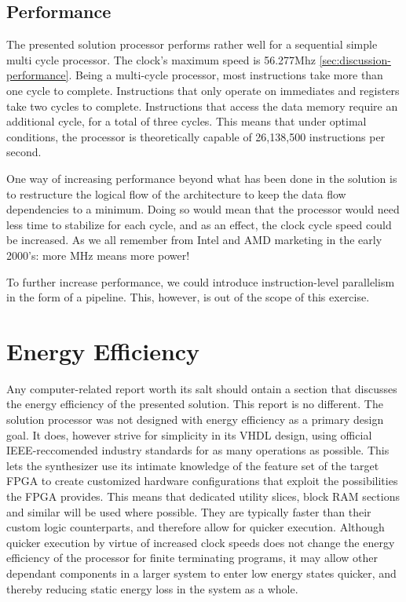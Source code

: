 \subsection{Performance}

The presented solution processor performs rather well for a sequential simple multi cycle processor.
The clock's maximum speed is 56.277Mhz \vref{sec:discussion-performance}.
Being a multi-cycle processor, most instructions take more than one cycle to complete.
Instructions that only operate on immediates and registers take two cycles to complete.
Instructions that access the data memory require an additional cycle, for a total of three cycles.
This means that under optimal conditions, the processor is theoretically capable of 26,138,500 instructions per second.

One way of increasing performance beyond what has been done in the solution is to restructure the logical flow of the architecture to keep the data flow dependencies to a minimum.
Doing so would mean that the processor would need less time to stabilize for each cycle, and as an effect, the clock cycle speed could be increased.
As we all remember from Intel and AMD marketing in the early 2000's: more MHz means more power!

To further increase performance, we could introduce instruction-level parallelism in the form of a pipeline.
This, however, is out of the scope of this exercise.

\section{Energy Efficiency}

Any computer-related report worth its salt should ontain a section that discusses the energy efficiency of the presented solution.
This report is no different.
The solution processor was not designed with energy efficiency as a primary design goal.
It does, however strive for simplicity in its VHDL design, using official IEEE-reccomended industry standards for as many operations as possible.
This lets the synthesizer use its intimate knowledge of the feature set of the target FPGA to create customized hardware configurations that exploit the possibilities the FPGA provides.
This means that dedicated utility slices, block RAM sections and similar will be used where possible.
They are typically faster than their custom logic counterparts, and therefore allow for quicker execution.
Although quicker execution by virtue of increased clock speeds does not change the energy efficiency of the processor for finite terminating programs, it may allow other dependant components in a larger system to enter low energy states quicker, and thereby reducing static energy loss in the system as a whole.

